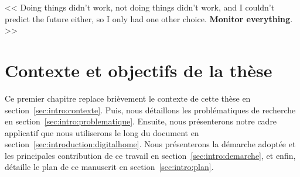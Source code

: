 \begin{savequote}[6cm]
<< Doing things didn't work, not doing things didn't work, and I couldn't predict the future either, so I only had one other choice. \textbf{Monitor everything}. >>
\end{savequote}
\chapter{Contexte et objectifs de la thèse}
\chaptertoc

Ce premier chapitre replace brièvement le contexte de cette thèse en section~\ref{sec:intro:contexte}. Puis, nous détaillons les problématiques de recherche en section~\ref{sec:intro:problematique}. Ensuite, nous présenterons notre cadre applicatif que nous utiliserons le long du document en section~\ref{sec:introduction:digitalhome}. Nous présenterons la démarche adoptée et les principales contribution de ce travail en section~\ref{sec:intro:demarche}, et enfin, détaille le plan de ce manuscrit en section~\ref{sec:intro:plan}.







